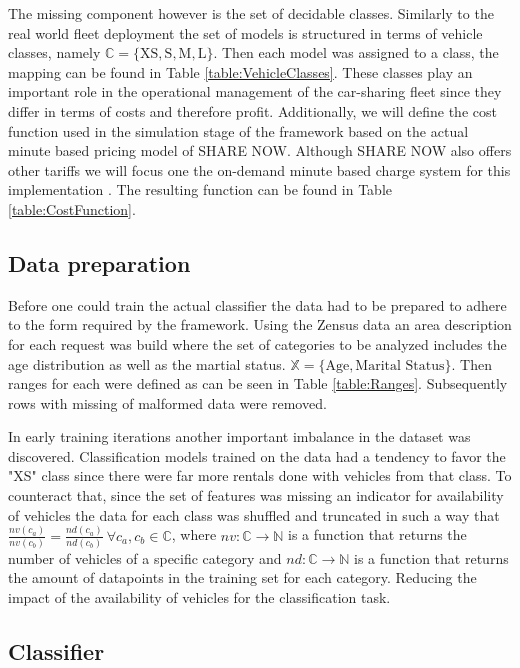 The missing component however is the set of decidable classes. Similarly to the real world fleet deployment the
set of models is structured in terms of vehicle classes, namely $\mathbb{C} = \{ \text{XS}, \text{S}, \text{M}, \text{L} \}$.
Then each model was assigned to a class, the mapping can be found in Table \ref{table:VehicleClasses}.
These classes play an important role in the operational management of the car-sharing fleet since they differ in terms of costs and therefore profit.
 Additionally, we will define the cost function used in the simulation stage
of the framework based on the actual minute based pricing model of SHARE NOW. Although SHARE NOW also offers other tariffs we will focus one
the on-demand minute based charge system for this implementation \cite{ShareNowPricing}. The resulting function can be found in Table \ref{table:CostFunction}.

\subsection{Data preparation}
\label{sub_sec:CaseStudy/Preparation}

Before one could train the actual classifier the data had to be prepared to adhere to the form
required by the framework. Using the Zensus data an area description for each request was
build where the set of categories to be analyzed includes the age distribution as well as the martial status.
$\mathbb{X} = \{ \text{Age}, \text{Marital Status} \}$. Then ranges for each were defined as can be seen in Table \ref{table:Ranges}.
Subsequently rows with missing of malformed data were removed.

In early training iterations another important imbalance in the dataset was discovered. Classification models
trained on the data had a tendency to favor the "XS" class since there were far more rentals done with
vehicles from that class. To counteract that, since the set of features was missing an indicator for availability
of vehicles the data for each class was shuffled and truncated in such a way that
$\frac{nv(c_a)}{nv(c_b)} = \frac{nd(c_a)}{nd(c_b)} \ \forall c_a, c_b \in \mathbb{C}$, where $nv: \mathbb{C} \to \mathbb{N}$ is a function
that returns the number of vehicles of a specific category and $nd: \mathbb{C} \to \mathbb{N}$ is a function that returns the
amount of datapoints in the training set for each category. Reducing the impact of the availability of vehicles for
the classification task.

\subsection{Classifier}
\label{sub_sec:CaseStudy/Classifier}

